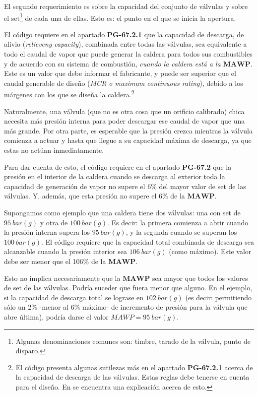 El segundo requerimiento es sobre la capacidad del conjunto de válvulas y sobre el set\footnote{Algunas denominaciones comunes son: timbre, tarado de la válvula, punto de disparo.} de cada una de ellas. Esto es: el punto en el que se inicia la apertura.

El código requiere en el apartado \textbf{PG-67.2.1} que la capacidad de descarga, de alivio (\textit{relieveng capacity}), combinada entre todas las válvulas, sea equivalente a todo el caudal de vapor que puede generar la caldera para todos sus combustibles y de acuerdo con su sistema de combustión, \textit{cuando la caldera está a la $\mathbf{MAWP}$}. Este es un valor que debe informar el fabricante, y puede ser superior que el caudal generable de diseño (\textit{MCR o maximum continuous rating}), debido a los márgenes con los que se diseña la caldera.\footnote{El código presenta algunas sutilezas más en el apartado \textbf{PG-67.2.1} acerca de la capacidad de descarga de las válvulas. Estas reglas debe tenerse en cuenta para el diseño. En \cite{MacKay_Pillow} se encuentra una explicación acerca de esto.}

Naturalmente, una válvula (que no es otra cosa que un orificio calibrado) chica necesita más presión interna para poder descargar ese caudal de vapor que una más grande. Por otra parte, es esperable que la presión crezca mientras la válvula comienza a actuar y hasta que llegue a su capacidad máxima de descarga, ya que estas no actúan inmediatamente.

Para dar cuenta de esto, el código requiere en el apartado \textbf{PG-67.2} que la presión en el interior de la caldera cuando se descarga al exterior toda la capacidad de generación de vapor no supere el 6\% del mayor valor de set de las válvulas. Y, además, que esta presión no supere el 6\% de la $\mathbf{MAWP}$.

Supongamos como ejemplo que una caldera tiene dos válvulas: una con set de $\SI{95}{bar(g)}$ y otra de $\SI{100}{bar(g)}$. Es decir: la primera comienza a abrir cuando la presión interna supera los $\SI{95}{bar(g)}$, y la segunda cuando se superan los $\SI{100}{bar(g)}$. El código requiere que la capacidad total combinada de descarga sea alcanzable cuando la presión interior sea $\SI{106}{bar(g)}$ (como máximo). Este valor debe ser menor que el 106\% de la $\mathbf{MAWP}$.

Esto no implica necesariamente que la $\mathbf{MAWP}$ sea mayor que todos los valores de set de las válvulas. Podría suceder que fuera menor que alguno. En el ejemplo, si la capacidad de descarga total se lograse en $\SI{102}{bar(g)}$ (es decir: permitiendo sólo un 2\% -menor al 6\% máximo- de incremento de presión para la válvula que abre última), podría darse el valor $MAWP=\SI{95}{bar(g)}$. 

